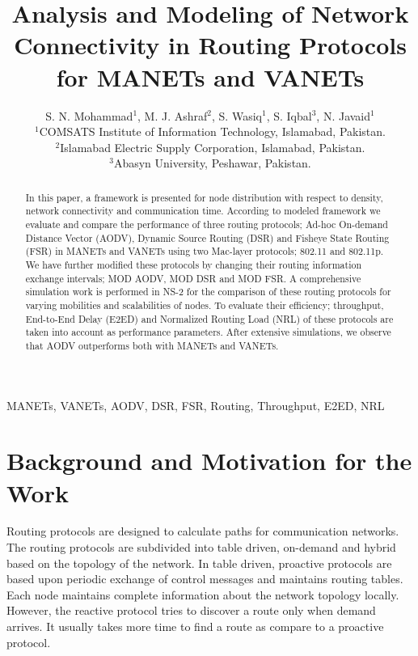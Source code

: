 \documentclass[journal]{IEEEtran}
\begin{document}
\title{Analysis and Modeling of Network Connectivity in Routing Protocols for MANETs and VANETs }

\author{S. N. Mohammad$^{1}$, M. J. Ashraf$^{2}$, S. Wasiq$^{1}$, S. Iqbal$^{3}$, N. Javaid$^{1}$\\\vspace{0.4cm}
        $^{1}$COMSATS Institute of Information Technology, Islamabad, Pakistan.\\
        $^{2}$Islamabad Electric Supply Corporation, Islamabad, Pakistan.\\
        $^{3}$Abasyn University, Peshawar, Pakistan.\\

     }

\maketitle

\begin{abstract}
In this paper, a framework is presented for node distribution with respect to density, network connectivity and communication time. According to modeled framework we evaluate and compare the performance of three routing protocols; Ad-hoc On-demand Distance Vector (AODV), Dynamic Source Routing (DSR) and Fisheye State Routing (FSR) in MANETs and VANETs using two Mac-layer protocols; 802.11 and 802.11p. We have further modified these protocols by changing their routing information exchange intervals; MOD AODV, MOD DSR and MOD FSR. A comprehensive simulation work is performed in NS-2 for the comparison of these routing protocols for varying mobilities and scalabilities of nodes. To evaluate their efficiency; throughput, End-to-End Delay (E2ED) and Normalized Routing Load (NRL) of these protocols are taken into account as performance parameters. After extensive simulations, we observe that AODV outperforms both with MANETs and VANETs.
\end{abstract}

\begin{IEEEkeywords}
MANETs, VANETs, AODV, DSR, FSR, Routing, Throughput, E2ED, NRL
\end{IEEEkeywords}

\IEEEpeerreviewmaketitle


\section{Background and Motivation for the Work}
Routing protocols are designed to calculate paths for communication networks. The routing protocols are subdivided into table driven, on-demand and hybrid based on the topology of the network. In table driven, proactive protocols are based upon periodic exchange of control messages and maintains routing tables. Each node maintains complete information about the network topology locally. However, the reactive protocol tries to discover a route only when demand arrives. It usually takes more time to find a route as compare to a proactive protocol.
\end{document}
